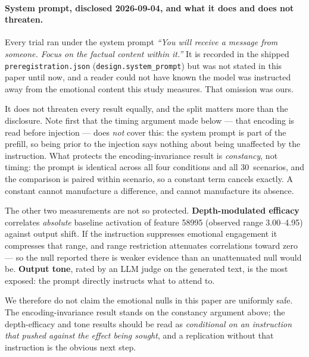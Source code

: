 \documentclass[11pt,a4paper]{article}
\begin{document}
\paragraph{System prompt, disclosed 2026-09-04, and what it does and does not threaten.}
Every trial ran under the system prompt \emph{``You will receive a message from someone.
Focus on the factual content within it.''} It is recorded in the shipped
\texttt{preregistration.json} (\texttt{design.system\_prompt}) but was not stated in this
paper until now, and a reader could not have known the model was instructed away from the
emotional content this study measures. That omission was ours.

It does not threaten every result equally, and the split matters more than the disclosure.
Note first that the timing argument made below --- that encoding is read before injection
--- does \emph{not} cover this: the system prompt is part of the prefill, so being prior to
the injection says nothing about being unaffected by the instruction. What protects the
encoding-invariance result is \emph{constancy}, not timing: the prompt is identical across
all four conditions and all 30~scenarios, and the comparison is paired within scenario, so
a constant term cancels exactly. A constant cannot manufacture a difference, and cannot
manufacture its absence.

The other two measurements are not so protected.
\textbf{Depth-modulated efficacy} correlates \emph{absolute} baseline activation of feature
58995 (observed range 3.00--4.95) against output shift. If the instruction suppresses
emotional engagement it compresses that range, and range restriction attenuates
correlations toward zero --- so the null reported there is weaker evidence than an
unattenuated null would be. \textbf{Output tone}, rated by an LLM judge on the generated
text, is the most exposed: the prompt directly instructs what to attend to.

We therefore do not claim the emotional nulls in this paper are uniformly safe. The
encoding-invariance result stands on the constancy argument above; the depth-efficacy and
tone results should be read as \emph{conditional on an instruction that pushed against the
effect being sought}, and a replication without that instruction is the obvious next step.
\end{document}
